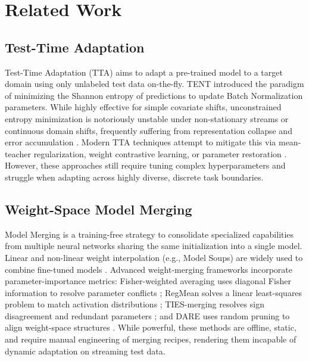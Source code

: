 \documentclass{article}
\theoremstyle{plain}
\theoremstyle{definition}
\theoremstyle{remark}
\begin{document}
\section{Related Work}
\label{sec:related}

\subsection{Test-Time Adaptation}
Test-Time Adaptation (TTA) aims to adapt a pre-trained model to a target domain using only unlabeled test data on-the-fly. TENT \cite{wang2021tent} introduced the paradigm of minimizing the Shannon entropy of predictions to update Batch Normalization parameters. While highly effective for simple covariate shifts, unconstrained entropy minimization is notoriously unstable under non-stationary streams or continuous domain shifts, frequently suffering from representation collapse and error accumulation \cite{niu2022efficient}. Modern TTA techniques attempt to mitigate this via mean-teacher regularization, weight contrastive learning, or parameter restoration \cite{niu2023towards, luan2026fisher}. However, these approaches still require tuning complex hyperparameters and struggle when adapting across highly diverse, discrete task boundaries.

\subsection{Weight-Space Model Merging}
Model Merging is a training-free strategy to consolidate specialized capabilities from multiple neural networks sharing the same initialization into a single model. Linear and non-linear weight interpolation (e.g., Model Soups) are widely used to combine fine-tuned models \cite{wortsman2022model}. Advanced weight-merging frameworks incorporate parameter-importance metrics: Fisher-weighted averaging uses diagonal Fisher information to resolve parameter conflicts \cite{matena2022merging}; RegMean solves a linear least-squares problem to match activation distributions \cite{jin2023regmean}; TIES-merging resolves sign disagreement and redundant parameters \cite{yadav2023ties}; and DARE uses random pruning to align weight-space structures \cite{yu2023language}. While powerful, these methods are offline, static, and require manual engineering of merging recipes, rendering them incapable of dynamic adaptation on streaming test data.
\end{document}
